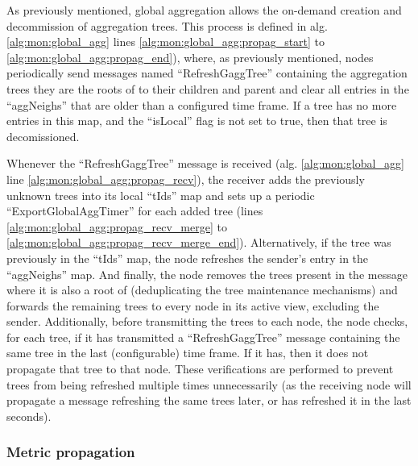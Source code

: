 As previously mentioned, global aggregation allows the on-demand creation and decommission of aggregation trees. This process is defined in alg. \ref{alg:mon:global_agg} lines \ref{alg:mon:global_agg:propag_start} to \ref{alg:mon:global_agg:propag_end}), where, as previously mentioned, nodes periodically send messages named ``RefreshGaggTree'' containing the aggregation trees they are the roots of to their children and parent and clear all entries in the ``aggNeighs'' that are older than a configured time frame. If a tree has no more entries in this map, and the ``isLocal'' flag is not set to true, then that tree is decomissioned.


Whenever the ``RefreshGaggTree'' message is received (alg. \ref{alg:mon:global_agg} line \ref{alg:mon:global_agg:propag_recv}), the receiver adds the previously unknown trees into its local ``tIds'' map and sets up a periodic ``ExportGlobalAggTimer'' for each added tree (lines \ref{alg:mon:global_agg:propag_recv_merge} to \ref{alg:mon:global_agg:propag_recv_merge_end}). Alternatively, if the tree was previously in the ``tIds'' map, the node refreshes the sender's entry in the ``aggNeighs'' map. And finally, the node removes the trees present in the message where it is also a root of (deduplicating the tree maintenance mechanisms) and forwards the remaining trees to every node in its active view, excluding the sender. Additionally, before transmitting the trees to each node, the node checks, for each tree, if it has transmitted a ``RefreshGaggTree'' message containing the same tree in the last (configurable) time frame. If it has, then it does not propagate that tree to that node. These verifications are performed to prevent trees from being refreshed multiple times unnecessarily (as the receiving node will propagate a message refreshing the same trees later, or has refreshed it in the last seconds). 

\subsubsection{Metric propagation}

